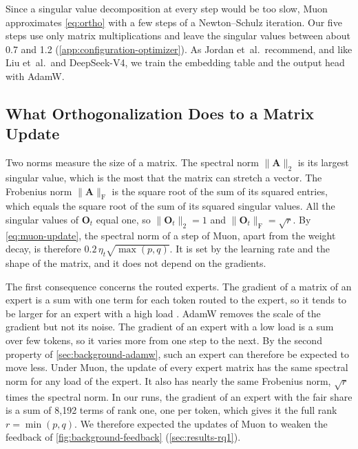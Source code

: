 Since a singular value decomposition at every step would be too slow, Muon approximates \cref{eq:ortho} with a few steps of a Newton--Schulz iteration. Our five steps use only matrix multiplications and leave the singular values between about 0.7 and 1.2 (\cref{app:configuration-optimizer}). As Jordan et~al.\ recommend, and like Liu et~al.\ and DeepSeek-V4, we train the embedding table and the output head with AdamW.

\subsection{What Orthogonalization Does to a Matrix Update}
\label{sec:background-orthogonalization}
Two norms measure the size of a matrix. The spectral norm $\lVert \mathbf{A} \rVert_2$ is its largest singular value, which is the most that the matrix can stretch a vector. The Frobenius norm $\lVert \mathbf{A} \rVert_{\mathrm{F}}$ is the square root of the sum of its squared entries, which equals the square root of the sum of its squared singular values. All the singular values of $\mathbf{O}_t$ equal one, so $\lVert \mathbf{O}_t \rVert_2 = 1$ and $\lVert \mathbf{O}_t \rVert_{\mathrm{F}} = \sqrt{r}$. By \cref{eq:muon-update}, the spectral norm of a step of Muon, apart from the weight decay, is therefore $0.2 \, \eta_t \sqrt{\max(p, q)}$. It is set by the learning rate and the shape of the matrix, and it does not depend on the gradients.

The first consequence concerns the routed experts. The gradient of a matrix of an expert is a sum with one term for each token routed to the expert, so it tends to be larger for an expert with a high load \cite{wang2026depth}. AdamW removes the scale of the gradient but not its noise. The gradient of an expert with a low load is a sum over few tokens, so it varies more from one step to the next. By the second property of \cref{sec:background-adamw}, such an expert can therefore be expected to move less. Under Muon, the update of every expert matrix has the same spectral norm for any load of the expert. It also has nearly the same Frobenius norm, $\sqrt{r}$ times the spectral norm. In our runs, the gradient of an expert with the fair share is a sum of 8,192 terms of rank one, one per token, which gives it the full rank $r = \min(p, q)$. We therefore expected the updates of Muon to weaken the feedback of \cref{fig:background-feedback} (\cref{sec:results-rq1}).

